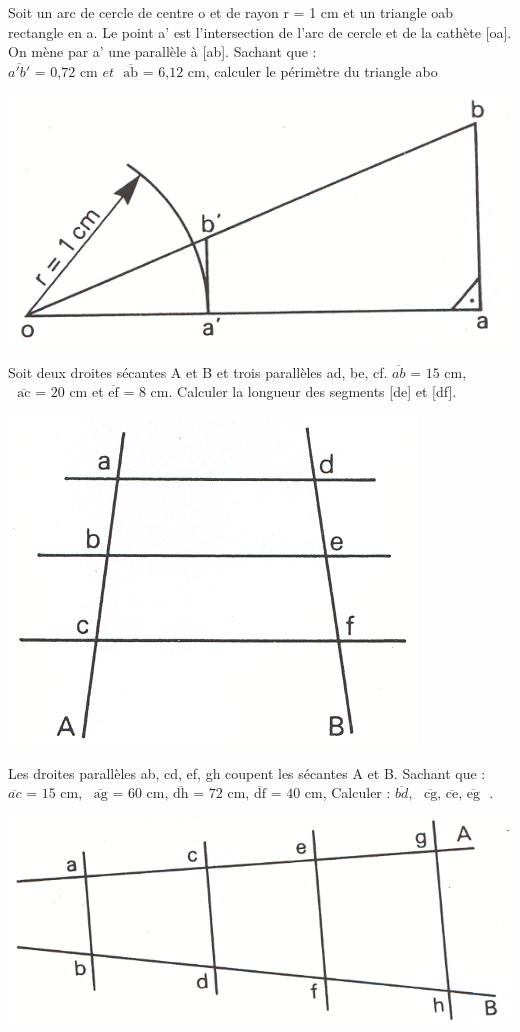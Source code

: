 \begin{exercice}
Soit un arc de cercle de centre o et de rayon r = 1 cm et un triangle oab rectangle en a.
Le point a' est l'intersection de l'arc de cercle et de la cathète [oa].
On mène par a' une parallèle à [ab]. 
Sachant que : $\overline{a'b'}\text{ = 0,72 cm }et\text{ }\overline{\text{ab}}\text{ = 6,12 cm}$, 
calculer le périmètre du triangle abo
\begin{center}
\includegraphics[width = 0.4 \textwidth]{triangle/image/pyth20.png}
\end{center}
\end{exercice}

\begin{exercice}
Soit deux droites sécantes A et B et trois parallèles ad, be, cf.
$\overline{ab}\text{ = 15 cm}$, $\text{ }\overline{\text{ac}}\text{ = 20 cm}$
et $\overline{\text{ef}}\text{ = 8 cm}$.
Calculer la longueur des segments [de] et [df].
\begin{center}
\includegraphics[width = 0.4 \textwidth]{triangle/image/pyth21.png}
\end{center}
\end{exercice}

\begin{exercice}
Les droites parallèles ab, cd, ef, gh coupent les sécantes A et B.
Sachant que : $\overline{ac}\text{ = 15 cm},\text{ }\overline{\text{ag}}\text{ = 60 cm,  }\overline{\text{dh}}\text{ = 72 cm, }\overline{\text{df}}\text{ = 40 cm}$,
Calculer : $\overline{bd},\text{ }\overline{\text{cg}}\text{, }\overline{\text{ce}}\text{, }\overline{\text{eg}}\text{ }$.
\begin{center}
\includegraphics[width = 0.4 \textwidth]{triangle/image/pyth22.png}
\end{center}
\end{exercice}

